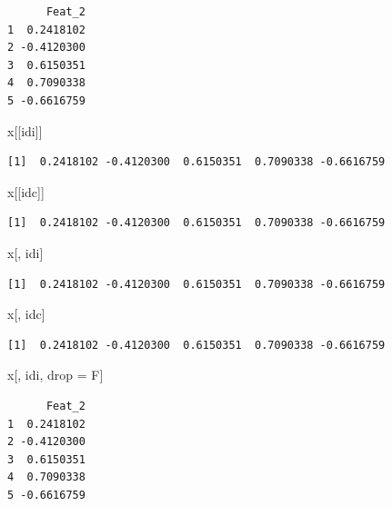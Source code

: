 \documentclass[
]{book}
\newenvironment{Shaded}{\begin{snugshade}}{\end{snugshade}}
\newcommand{\NormalTok}[1]{#1}
\newcommand{\OtherTok}[1]{\textcolor[rgb]{0.56,0.35,0.01}{#1}}
\begin{document}
\begin{verbatim}
      Feat_2
1  0.2418102
2 -0.4120300
3  0.6150351
4  0.7090338
5 -0.6616759
\end{verbatim}

\begin{Shaded}
\begin{Highlighting}[]
\NormalTok{x[[idi]]}
\end{Highlighting}
\end{Shaded}

\begin{verbatim}
[1]  0.2418102 -0.4120300  0.6150351  0.7090338 -0.6616759
\end{verbatim}

\begin{Shaded}
\begin{Highlighting}[]
\NormalTok{x[[idc]]}
\end{Highlighting}
\end{Shaded}

\begin{verbatim}
[1]  0.2418102 -0.4120300  0.6150351  0.7090338 -0.6616759
\end{verbatim}

\begin{Shaded}
\begin{Highlighting}[]
\NormalTok{x[, idi]}
\end{Highlighting}
\end{Shaded}

\begin{verbatim}
[1]  0.2418102 -0.4120300  0.6150351  0.7090338 -0.6616759
\end{verbatim}

\begin{Shaded}
\begin{Highlighting}[]
\NormalTok{x[, idc]}
\end{Highlighting}
\end{Shaded}

\begin{verbatim}
[1]  0.2418102 -0.4120300  0.6150351  0.7090338 -0.6616759
\end{verbatim}

\begin{Shaded}
\begin{Highlighting}[]
\NormalTok{x[, idi, drop }\OtherTok{=}\NormalTok{ F]}
\end{Highlighting}
\end{Shaded}

\begin{verbatim}
      Feat_2
1  0.2418102
2 -0.4120300
3  0.6150351
4  0.7090338
5 -0.6616759
\end{verbatim}
\end{document}
